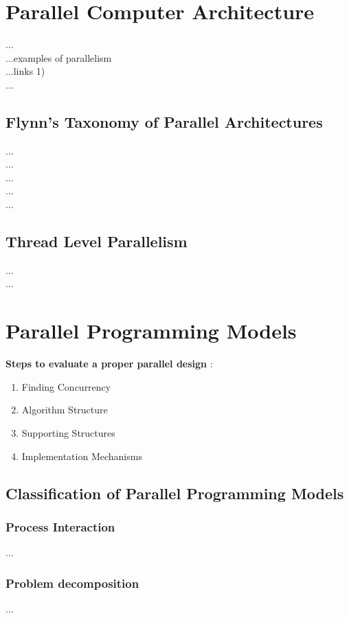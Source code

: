 \newpage

\section{Parallel Computer Architecture}

...\parencite[see][p9]{book1} \\
...examples of parallelism \parencite[see][p11]{book1} \\
...links 1) \\
...\parencite[see][p9 ff.]{book5}


\subsection{Flynn's Taxonomy of Parallel Architectures}

...\parencite[see][p5]{internet1}\\
...\parencite[see][p13]{book1}\\
...\parencite[see][p4]{book5}\\
...\parencite[see][p2]{book6}\\
...\parencite[see][p15-p26]{internet2}

\subsection{Thread Level Parallelism}

...\parencite[see][p24]{book1}\\
...\parencite[see][p14]{article6}

\section{Parallel Programming Models}

\textbf{Steps to evaluate a proper parallel design} \parencite[see][p6]{article6}:
\begin{enumerate}
	\item Finding Concurrency
	\item Algorithm Structure
	\item Supporting Structures
	\item Implementation Mechanisms
\end{enumerate}

\newpage

\subsection{Classification of Parallel Programming Models}

\subsubsection{Process Interaction}

...\parencite[see][p4]{internet1}

\subsubsection{Problem decomposition}

...\parencite[see][p105 ff.]{book1}